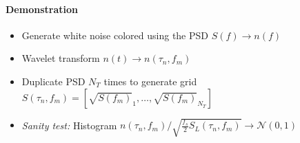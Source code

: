 \documentclass{article}
\begin{document}
\paragraph{Demonstration}

\begin{itemize}
    \item Generate white noise colored using the PSD $S(f)\rightarrow n(f)$
    \item Wavelet transform $n(t)\rightarrow n(\tau_n,f_m)$
    \item Duplicate PSD $N_T$ times to generate grid $S(\tau_n, f_m)=  [\sqrt{S(f_m)}_1, \dots,  \sqrt{S(f_m)}_{N_T}]$
    \item \textit{Sanity test:} Histogram $n(\tau_n,f_m)/\sqrt{\frac{f_s}{2}S_L(\tau_n, f_m)} \rightarrow \mathcal{N}(0,1) $
\end{itemize}
\end{document}
